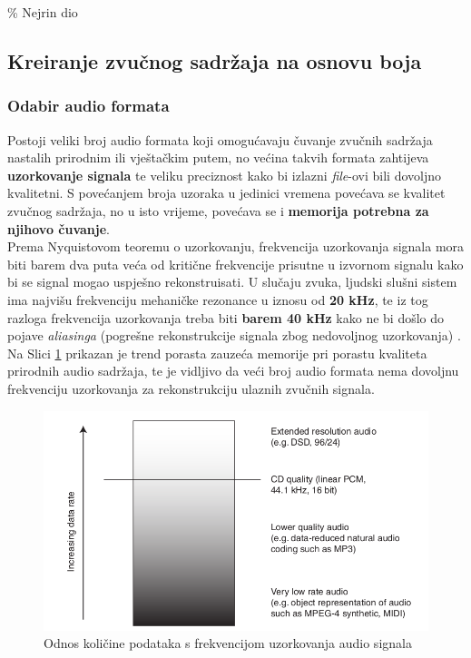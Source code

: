 \documentclass[12pt,a4paper]{article}
\begin{document}
\% Nejrin dio

\subsection{Kreiranje zvučnog sadržaja na osnovu boja}

\subsubsection{Odabir audio formata}

Postoji veliki broj audio formata koji omogućavaju čuvanje zvučnih sadržaja nastalih prirodnim ili vještačkim putem, no većina takvih formata zahtijeva \textbf{uzorkovanje signala} te veliku preciznost kako bi izlazni \textit{file}-ovi bili dovoljno kvalitetni. S povećanjem broja uzoraka u jedinici vremena povećava se kvalitet zvučnog sadržaja, no u isto vrijeme, povećava se i \textbf{memorija potrebna za njihovo čuvanje}. \\

Prema Nyquistovom teoremu o uzorkovanju, frekvencija uzorkovanja signala mora biti barem dva puta veća od kritične frekvencije prisutne u izvornom signalu kako bi se signal mogao uspješno rekonstruisati. U slučaju zvuka, ljudski slušni sistem ima najvišu frekvenciju mehaničke rezonance u iznosu od \textbf{20 kHz}, te iz tog razloga frekvencija uzorkovanja treba biti \textbf{barem 40 kHz} kako ne bi došlo do pojave \textit{aliasinga} (pogrešne rekonstrukcije signala zbog nedovoljnog uzorkovanja) \cite{shupi}. Na Slici \ref{audioQualities} prikazan je trend porasta zauzeća memorije pri porastu kvaliteta prirodnih audio sadržaja, te je vidljivo da veći broj audio formata nema dovoljnu frekvenciju uzorkovanja za rekonstrukciju ulaznih zvučnih signala. \cite{dat}\\

\begin{figure}[H]

\center
\includegraphics[scale=0.5]{../res/audioQualities.png}
\caption{Odnos količine podataka s frekvencijom uzorkovanja audio signala \cite{dat}}
\label{audioQualities}

\end{figure}
\end{document}
